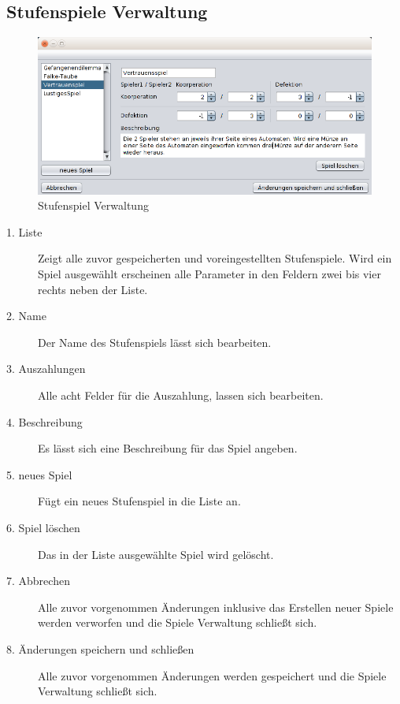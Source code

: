 \pagebreak

\subsection{Stufenspiele Verwaltung}

\begin{figure}[hp] 
  \centering
     \includegraphics[width=1.1\textwidth]{GUI_Entwurf/SpieleMenue.png}
  \caption{Stufenspiel Verwaltung}
  \label{fig:Bild1}
\end{figure}

\begin{description}

\item[1. Liste] Zeigt alle zuvor gespeicherten und voreingestellten Stufenspiele. Wird ein Spiel ausgewählt erscheinen alle Parameter in den Feldern zwei bis vier rechts neben der Liste.

\item[2. Name] Der Name des Stufenspiels lässt sich bearbeiten.

\item[3. Auszahlungen] Alle acht Felder für die Auszahlung, lassen sich bearbeiten.

\item[4. Beschreibung] Es lässt sich eine Beschreibung für das Spiel angeben.

\item[5. neues Spiel] Fügt ein neues Stufenspiel in die Liste an. 

\item[6. Spiel löschen] Das in der Liste ausgewählte Spiel wird gelöscht.

\item[7. Abbrechen] Alle zuvor vorgenommen Änderungen inklusive das Erstellen neuer Spiele werden verworfen und die Spiele Verwaltung schließt sich.

\item[8. Änderungen speichern und schließen] Alle zuvor vorgenommen Änderungen werden gespeichert und die Spiele Verwaltung schließt sich.

\end{description}

